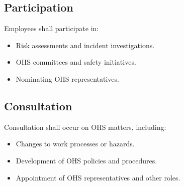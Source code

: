 \documentclass[12pt]{article}
\begin{document}
\subsection{Participation}
Employees shall participate in:
\begin{itemize}
    \item Risk assessments and incident investigations.
    \item OHS committees and safety initiatives.
    \item Nominating OHS representatives.
\end{itemize}

\subsection{Consultation}
Consultation shall occur on OHS matters, including:
\begin{itemize}
    \item Changes to work processes or hazards.
    \item Development of OHS policies and procedures.
    \item Appointment of OHS representatives and other roles.
\end{itemize}
\end{document}
